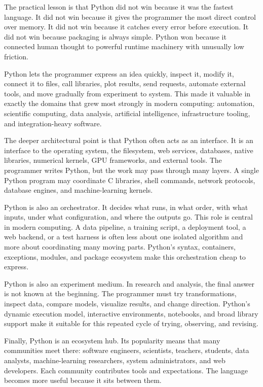 The practical lesson is that Python did not win because it was the fastest language. It did not win because it gives the programmer the most direct control over memory. It did not win because it catches every error before execution. It did not win because packaging is always simple. Python won because it connected human thought to powerful runtime machinery with unusually low friction.

Python lets the programmer express an idea quickly, inspect it, modify it, connect it to files, call libraries, plot results, send requests, automate external tools, and move gradually from experiment to system. This made it valuable in exactly the domains that grew most strongly in modern computing: automation, scientific computing, data analysis, artificial intelligence, infrastructure tooling, and integration-heavy software.

The deeper architectural point is that Python often acts as an interface. It is an interface to the operating system, the filesystem, web services, databases, native libraries, numerical kernels, GPU frameworks, and external tools. The programmer writes Python, but the work may pass through many layers. A single Python program may coordinate C libraries, shell commands, network protocols, database engines, and machine-learning kernels.

Python is also an orchestrator. It decides what runs, in what order, with what inputs, under what configuration, and where the outputs go. This role is central in modern computing. A data pipeline, a training script, a deployment tool, a web backend, or a test harness is often less about one isolated algorithm and more about coordinating many moving parts. Python's syntax, containers, exceptions, modules, and package ecosystem make this orchestration cheap to express.

Python is also an experiment medium. In research and analysis, the final answer is not known at the beginning. The programmer must try transformations, inspect data, compare models, visualize results, and change direction. Python's dynamic execution model, interactive environments, notebooks, and broad library support make it suitable for this repeated cycle of trying, observing, and revising.

Finally, Python is an ecosystem hub. Its popularity means that many communities meet there: software engineers, scientists, teachers, students, data analysts, machine-learning researchers, system administrators, and web developers. Each community contributes tools and expectations. The language becomes more useful because it sits between them.

